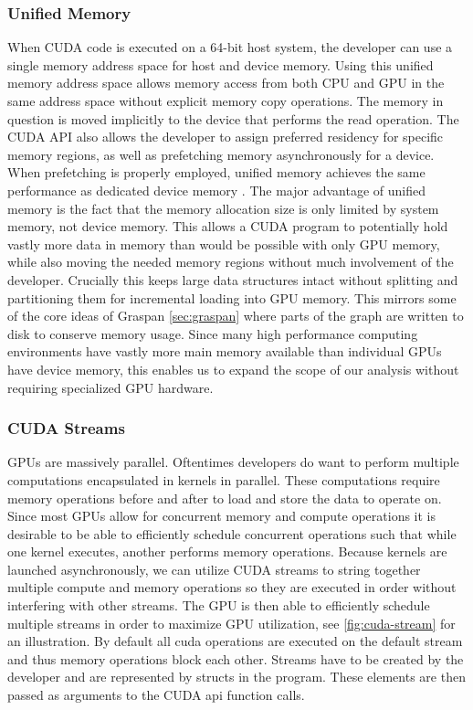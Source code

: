 \subsubsection{Unified Memory}
When CUDA code is executed on a 64-bit host system, the developer can use a single memory address space for host and device memory.
Using this unified memory address space allows memory access from both CPU and GPU in the same address space without explicit memory copy operations.
The memory in question is moved implicitly to the device that performs the read operation. The CUDA API also allows the developer to assign preferred residency for specific memory regions, as well as prefetching memory asynchronously for a device. When prefetching is properly employed, unified memory achieves the same performance as dedicated device memory \cite{cudaunifiedmem}.
The major advantage of unified memory is the fact that the memory allocation size is only limited by system memory, not device memory.
This allows a CUDA program to potentially hold vastly more data in memory than would be possible with only GPU memory, while also moving the needed memory regions without much involvement of the developer.
Crucially this keeps large data structures intact without splitting and partitioning them for incremental loading into GPU memory.
This mirrors some of the core ideas of Graspan \autoref{sec:graspan} where parts of the graph are written to disk to conserve memory usage.
Since many high performance computing environments have vastly more main memory available than individual GPUs have device memory, this enables us to expand the scope of our analysis without requiring specialized GPU hardware.

\subsubsection{CUDA Streams}
GPUs are massively parallel. Oftentimes developers do want to perform multiple computations encapsulated in kernels in parallel.
These computations require memory operations before and after to load and store the data to operate on.
Since most GPUs allow for concurrent memory and compute operations it is desirable to be able to efficiently schedule concurrent operations such that while one kernel executes, another performs memory operations.
Because kernels are launched asynchronously, we can utilize CUDA streams to string together multiple compute and memory operations so they are executed in order without interfering with other streams.
The GPU is then able to efficiently schedule multiple streams in order to maximize GPU utilization, see  \autoref{fig:cuda-stream} for an illustration.
By default all cuda operations are executed on the default stream and thus memory operations block each other.
Streams have to be created by the developer and are represented by structs in the program. These elements are then passed as arguments to the CUDA api function calls.

